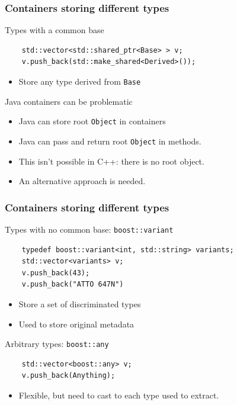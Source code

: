 \documentclass{beamer}
\begin{document}
\begin{frame}[fragile]
  \frametitle{Containers storing different types}
\begin{block}{Types with a common base}
  \begin{lstlisting}
    std::vector<std::shared_ptr<Base> > v;
    v.push_back(std::make_shared<Derived>());
\end{lstlisting}
  \begin{itemize}
  \item Store any type derived from \texttt{Base}
  \end{itemize}
\end{block}
\begin{block}{Java containers can be problematic}
  \begin{itemize}
  \item Java can store root \texttt{Object} in containers
  \item Java can pass and return root \texttt{Object} in methods.
  \item This isn't possible in C++: there is no root object.
  \item An alternative approach is needed.
  \end{itemize}
\end{block}
\end{frame}

\begin{frame}[fragile]
  \frametitle{Containers storing different types}
\begin{block}{Types with no common base: \texttt{boost::variant}}
  \begin{lstlisting}
    typedef boost::variant<int, std::string> variants;
    std::vector<variants> v;
    v.push_back(43);
    v.push_back("ATTO 647N")
\end{lstlisting}
  \begin{itemize}
  \item Store a set of discriminated types
  \item Used to store original metadata
  \end{itemize}
\end{block}
\begin{block}{Arbitrary types: \texttt{boost::any}}
  \begin{lstlisting}
    std::vector<boost::any> v;
    v.push_back(Anything);
\end{lstlisting}
  \begin{itemize}
  \item Flexible, but need to cast to each type used to extract.
  \end{itemize}
\end{block}
\end{frame}
\end{document}
